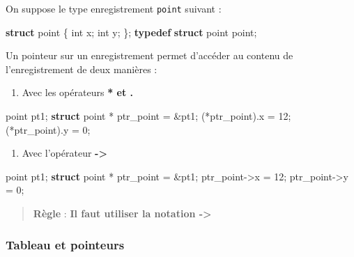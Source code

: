 \documentclass[11pt]{article}
\providecommand{\tightlist}{%
      \setlength{\itemsep}{0pt}\setlength{\parskip}{0pt}}
\newenvironment{Shaded}{}{}
\newcommand{\KeywordTok}[1]{\textcolor[rgb]{0.00,0.44,0.13}{\textbf{{#1}}}}
\newcommand{\DataTypeTok}[1]{\textcolor[rgb]{0.56,0.13,0.00}{{#1}}}
\newcommand{\DecValTok}[1]{\textcolor[rgb]{0.25,0.63,0.44}{{#1}}}
\newcommand{\NormalTok}[1]{{#1}}
\begin{document}
On suppose le type enregistrement \texttt{point} suivant :

\begin{Shaded}
\begin{Highlighting}[]
    \KeywordTok{struct}\NormalTok{ point \{}
        \DataTypeTok{int}\NormalTok{ x;}
        \DataTypeTok{int}\NormalTok{ y;}
\NormalTok{    \};}
    \KeywordTok{typedef} \KeywordTok{struct}\NormalTok{ point point;}
\end{Highlighting}
\end{Shaded}

Un pointeur sur un enregistrement permet d'accéder au contenu de
l'enregistrement de deux manières :

\begin{enumerate}
\def\labelenumi{\arabic{enumi}.}
\tightlist
\item
  Avec les opérateurs \textbf{* et .}\\
\end{enumerate}

\begin{Shaded}
\begin{Highlighting}[]
\NormalTok{    point pt1;}
    \KeywordTok{struct}\NormalTok{ point * ptr\_point = \&pt1; }
\NormalTok{    (*ptr\_point).x = }\DecValTok{12}\NormalTok{; }
\NormalTok{    (*ptr\_point).y = }\DecValTok{0}\NormalTok{; }
\end{Highlighting}
\end{Shaded}

\begin{enumerate}
\def\labelenumi{\arabic{enumi}.}
\setcounter{enumi}{1}
\tightlist
\item
  Avec l'opérateur \textbf{-\textgreater{}}
\end{enumerate}

\begin{Shaded}
\begin{Highlighting}[]
\NormalTok{    point pt1;}
    \KeywordTok{struct}\NormalTok{ point * ptr\_point = \&pt1; }
\NormalTok{    ptr\_point{-}\textgreater{}x = }\DecValTok{12}\NormalTok{; }
\NormalTok{    ptr\_point{-}\textgreater{}y = }\DecValTok{0}\NormalTok{; }
\end{Highlighting}
\end{Shaded}

\begin{quote}
\textbf{Règle} : \textbf{Il faut utiliser la notation -\textgreater{}}
\end{quote}

    \hypertarget{tableau-et-pointeurs}{%
\subsubsection{Tableau et pointeurs}\label{tableau-et-pointeurs}}
\end{document}
